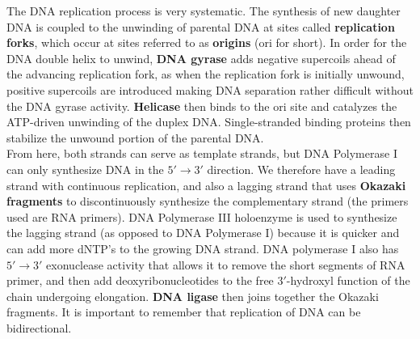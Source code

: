 \documentclass{article}
\theoremstyle{plain}%
\theoremstyle{definition}
\theoremstyle{remark}
\begin{document}
\indent The DNA replication process is very systematic. The synthesis of new daughter DNA is coupled to the unwinding of parental DNA at sites called \textbf{replication forks}, which occur at sites referred to as \textbf{origins} (ori for short). In order for the DNA double helix to unwind, \textbf{DNA gyrase} adds negative supercoils ahead of the advancing replication fork, as when the replication fork is initially unwound, positive supercoils are introduced making DNA separation rather difficult without the DNA gyrase activity. \textbf{Helicase} then binds to the ori site and catalyzes the ATP-driven unwinding of the duplex DNA. Single-stranded binding proteins then stabilize the unwound portion of the parental DNA. \\
\indent From here, both strands can serve as template strands, but DNA Polymerase I can only synthesize DNA in the $5'\rightarrow3'$ direction. We therefore have a leading strand with continuous replication, and also a lagging strand that uses \textbf{Okazaki fragments} to discontinuously synthesize the complementary strand (the primers used are RNA primers). DNA Polymerase III holoenzyme is used to synthesize the lagging strand (as opposed to DNA Polymerase I) because it is quicker and can add more dNTP's to the growing DNA strand. DNA polymerase I also has $5'\rightarrow3'$ exonuclease activity that allows it to remove the short segments of RNA primer, and then add deoxyribonucleotides to the free $3'$-hydroxyl function of the chain undergoing elongation. \textbf{DNA ligase} then joins together the Okazaki fragments. It is important to remember that replication of DNA can be bidirectional.
\end{document}
